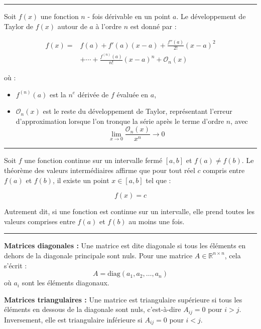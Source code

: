 \hrule
\begin{f}
 
Soit \( f(x) \) une fonction \( n \) - fois dérivable en un point \( a \). Le développement de Taylor de \( f(x) \) autour de \( a \) à l'ordre \(n\) est donné par :

\begin{align*}
 f(x) =& f(a) + f'(a)(x - a) + \frac{f''(a)}{2!}(x - a)^2 \\
 &+ \cdots + \frac{f^{(n)}(a)}{n!}(x - a)^n + \mathcal{O}_n(x)
\end{align*}


où :
\begin{itemize}
    \item \( f^{(n)}(a) \) est la \( n^e \) dérivée de \( f \) évaluée en \( a \),
    \item \( \mathcal{O}_n(x) \) est le reste du développement de Taylor, représentant l'erreur d'approximation lorsque l'on tronque la série après le terme d'ordre \( n \), avec 
    \[
    \lim_{x\rightarrow 0}\frac{\mathcal{O}_n(x) }{x^n}\to 0
    \]
\end{itemize}
\end{f}
\hrule
\begin{f} 

Soit \( f \) une fonction continue sur un intervalle fermé \([a, b]\) et \( f(a) \neq f(b) \). Le théorème des valeurs intermédiaires affirme que pour tout réel \( c \) compris entre \( f(a) \) et \( f(b) \), il existe un point \( x \in [a, b] \) tel que :

\[
f(x) = c
\]

Autrement dit, si une fonction est continue sur un intervalle, elle prend toutes les valeurs comprises entre \( f(a) \) et \( f(b) \) au moins une fois.
\end{f}
\hrule
\begin{f}
  
\textbf{Matrices diagonales :}
Une matrice est dite diagonale si tous les éléments en dehors de la diagonale principale sont nuls. Pour une matrice \( A \in \mathbb{R}^{n \times n} \), cela s'écrit :
\[
A = \text{diag}(a_1, a_2, \dots, a_n)
\]
où \( a_i \) sont les éléments diagonaux.

\textbf{Matrices triangulaires :}
Une matrice est triangulaire supérieure si tous les éléments en dessous de la diagonale sont nuls, c'est-à-dire \( A_{ij} = 0 \) pour \( i > j \). Inversement, elle est triangulaire inférieure si \( A_{ij} = 0 \) pour \( i < j \).
\end{f}
